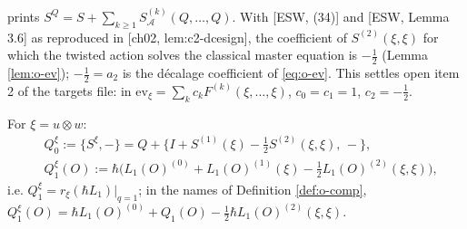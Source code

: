 \begin{remark} prints $S^Q=S+\sum_{k\ge1}S^{(k)}_{\mathcal A}(Q,\dots,Q)$. With [ESW, (34)] and [ESW, Lemma 3.6] as reproduced in [ch02, lem:c2-dcesign], the coefficient of $S^{(2)}(\xi,\xi)$ for which the twisted action solves the classical master equation is $-\tfrac12$ (Lemma \ref{lem:o-ev}); $-\tfrac12=a_2$ is the décalage coefficient of \eqref{eq:o-ev}. This settles open item 2 of the targets file: in $\mathrm{ev}_\xi=\sum_kc_kF^{(k)}(\xi,\dots,\xi)$, $c_0=c_1=1$, $c_2=-\tfrac12$.
\end{remark}

\begin{definition}
\label{def:o-twisted}
For $\xi=u\otimes w$:
\[
\begin{aligned}
&Q_0^\xi:=\{S^\xi,-\}=Q+\big\{I+S^{(1)}(\xi)-\tfrac12S^{(2)}(\xi,\xi),\,-\big\},\\
&Q_1^\xi(O):=\hbar\Big(L_1(O)^{(0)}+L_1(O)^{(1)}(\xi)-\tfrac12L_1(O)^{(2)}(\xi,\xi)\Big),
\end{aligned}
\]
i.e. $Q_1^\xi=r_\xi(\hbar L_1)|_{q=1}$; in the names of Definition \ref{def:o-comp}, $Q_1^\xi(O)=\hbar L_1(O)^{(0)}+Q_1(O)-\tfrac12\hbar L_1(O)^{(2)}(\xi,\xi)$.
\end{definition}


